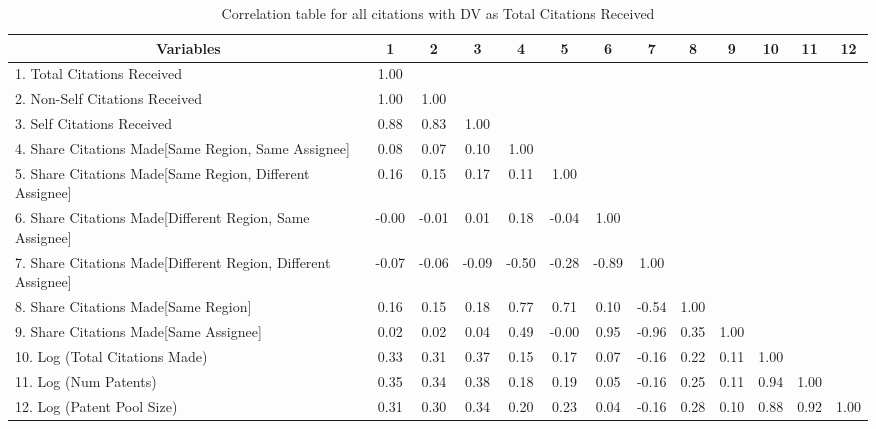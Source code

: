 \begin{table}[htbp]\centering \caption{Correlation table for all citations with DV as Total Citations Received\label{a.e.o.t.n.tcorrelation}}
\scriptsize
\singlespacing
\begin{adjustbox}{angle=90}
\begin{tabular}{l  c  c  c  c  c  c  c  c  c  c  c  c }\hline\hline
\multicolumn{1}{c}{Variables} &1&2&3&4&5&6&7&8&9&10&11&12\\ \hline
1. Total Citations Received&1.00\\
2. Non-Self Citations Received&1.00&1.00\\
3. Self Citations Received&0.88&0.83&1.00\\
4. Share Citations Made[Same Region, Same Assignee]&0.08&0.07&0.10&1.00\\
5. Share Citations Made[Same Region, Different Assignee]&0.16&0.15&0.17&0.11&1.00\\
6. Share Citations Made[Different Region, Same Assignee]&-0.00&-0.01&0.01&0.18&-0.04&1.00\\
7. Share Citations Made[Different Region, Different Assignee]&-0.07&-0.06&-0.09&-0.50&-0.28&-0.89&1.00\\
8. Share Citations Made[Same Region]&0.16&0.15&0.18&0.77&0.71&0.10&-0.54&1.00\\
9. Share Citations Made[Same Assignee]&0.02&0.02&0.04&0.49&-0.00&0.95&-0.96&0.35&1.00\\
10. Log (Total Citations Made)&0.33&0.31&0.37&0.15&0.17&0.07&-0.16&0.22&0.11&1.00\\
11. Log (Num Patents)&0.35&0.34&0.38&0.18&0.19&0.05&-0.16&0.25&0.11&0.94&1.00\\
12. Log (Patent Pool Size)&0.31&0.30&0.34&0.20&0.23&0.04&-0.16&0.28&0.10&0.88&0.92&1.00\\
\hline \hline 
 \end{tabular}
 \end{adjustbox}
\end{table}
